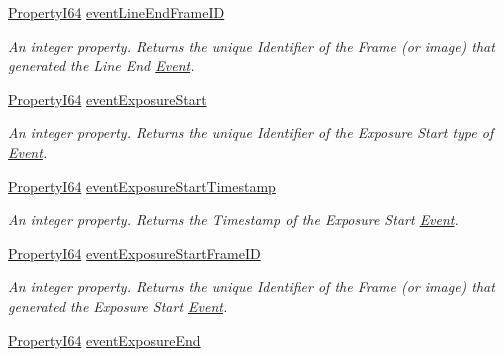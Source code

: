 \begin{DoxyCompactItemize}
\hyperlink{group___common_interface_ga81749b2696755513663492664a18a893}{Property\+I64} \hyperlink{classmv_i_m_p_a_c_t_1_1acquire_1_1_gen_i_cam_1_1_event_control_ab5f6f3f653b4954acae2f548de0a6543}{event\+Line\+End\+Frame\+I\+D}
\begin{DoxyCompactList}\small\item\em An integer property. Returns the unique Identifier of the Frame (or image) that generated the Line End \hyperlink{classmv_i_m_p_a_c_t_1_1acquire_1_1_event}{Event}. \end{DoxyCompactList}\item 
\hyperlink{group___common_interface_ga81749b2696755513663492664a18a893}{Property\+I64} \hyperlink{classmv_i_m_p_a_c_t_1_1acquire_1_1_gen_i_cam_1_1_event_control_a1c6acc9ed208c1c50519e2e3cbbc6656}{event\+Exposure\+Start}
\begin{DoxyCompactList}\small\item\em An integer property. Returns the unique Identifier of the Exposure Start type of \hyperlink{classmv_i_m_p_a_c_t_1_1acquire_1_1_event}{Event}. \end{DoxyCompactList}\item 
\hyperlink{group___common_interface_ga81749b2696755513663492664a18a893}{Property\+I64} \hyperlink{classmv_i_m_p_a_c_t_1_1acquire_1_1_gen_i_cam_1_1_event_control_a8a8732e5f9e21444163ca09e9e77b6aa}{event\+Exposure\+Start\+Timestamp}
\begin{DoxyCompactList}\small\item\em An integer property. Returns the Timestamp of the Exposure Start \hyperlink{classmv_i_m_p_a_c_t_1_1acquire_1_1_event}{Event}. \end{DoxyCompactList}\item 
\hyperlink{group___common_interface_ga81749b2696755513663492664a18a893}{Property\+I64} \hyperlink{classmv_i_m_p_a_c_t_1_1acquire_1_1_gen_i_cam_1_1_event_control_a72c8d3a3d49603ed0a23b9b3d8a100b1}{event\+Exposure\+Start\+Frame\+I\+D}
\begin{DoxyCompactList}\small\item\em An integer property. Returns the unique Identifier of the Frame (or image) that generated the Exposure Start \hyperlink{classmv_i_m_p_a_c_t_1_1acquire_1_1_event}{Event}. \end{DoxyCompactList}\item 
\hyperlink{group___common_interface_ga81749b2696755513663492664a18a893}{Property\+I64} \hyperlink{classmv_i_m_p_a_c_t_1_1acquire_1_1_gen_i_cam_1_1_event_control_a1c83aeb5d7fd6cf3ee8bf25b19a3331f}{event\+Exposure\+End}

\end{DoxyCompactItemize}
